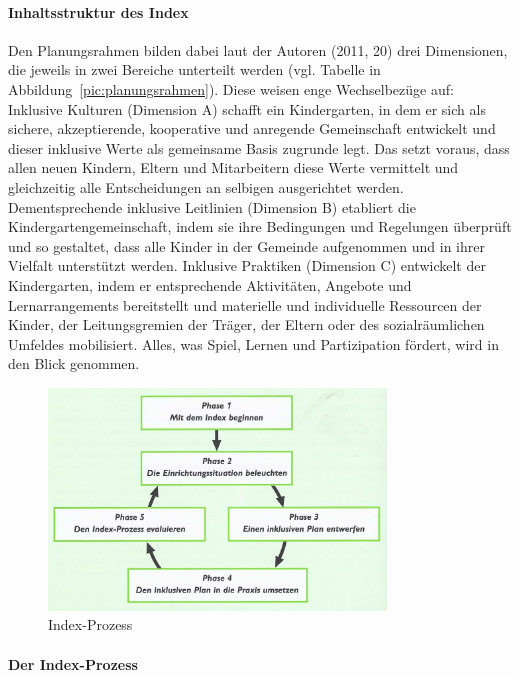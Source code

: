 \paragraph{Inhaltsstruktur des Index} Den Planungsrahmen bilden dabei laut der Autoren (2011, 20) drei Dimensionen, die jeweils in zwei Bereiche unterteilt werden (vgl. Tabelle in Abbildung~\ref{pic:planungsrahmen}). 
Diese weisen enge Wechselbezüge auf: Inklusive Kulturen (Dimension A) schafft ein Kindergarten, in dem er sich als sichere, akzeptierende, kooperative und anregende Gemeinschaft entwickelt und dieser inklusive Werte als gemeinsame Basis zugrunde legt. Das setzt voraus, dass allen neuen Kindern, Eltern und Mitarbeitern diese Werte vermittelt und gleichzeitig alle Entscheidungen an selbigen ausgerichtet werden.  
Dementsprechende inklusive Leitlinien (Dimension B) etabliert die Kindergartengemeinschaft, indem sie ihre Bedingungen und Regelungen überprüft und so gestaltet, dass alle Kinder in der Gemeinde aufgenommen und in ihrer Vielfalt unterstützt werden. Inklusive Praktiken (Dimension C) entwickelt der Kindergarten, indem er entsprechende Aktivitäten, Angebote und Lernarrangements bereitstellt und materielle und individuelle Ressourcen der Kinder, der Leitungsgremien der Träger, der Eltern oder des sozialräumlichen Umfeldes mobilisiert. Alles, was Spiel, Lernen und Partizipation fördert, wird in den Blick genommen.   

\begin{figure}
  \centering
  \label{pic:indexProzess}
  \includegraphics[width=0.8\textwidth]{bilder/indexProzess}
  \caption{Index-Prozess}
\end{figure}

\paragraph{Der Index-Prozess}

